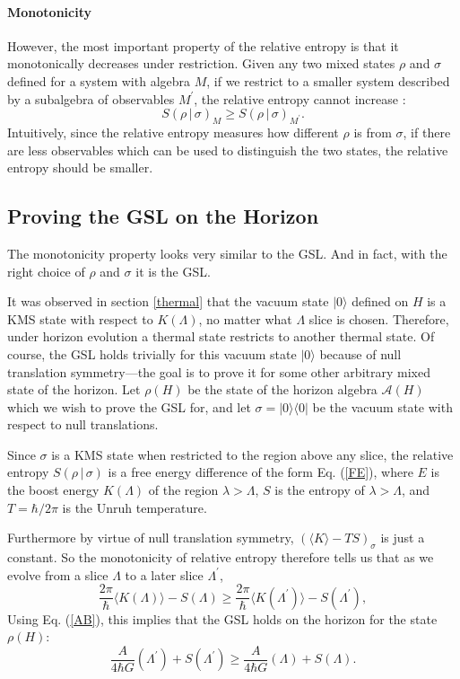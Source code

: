 \documentclass{article}
\begin{document}
\paragraph{Monotonicity} However, the most important property of the relative entropy is that it monotonically decreases under restriction.  Given any two mixed states $\rho$ and $\sigma$ defined for a system with algebra $M$, if we restrict to a smaller system described by a subalgebra of observables $M^\prime$, the relative entropy cannot increase \cite{lindblad75}:
\begin{equation}
S(\rho\,|\,\sigma)_M \ge S(\rho\,|\,\sigma)_{M^\prime}.
\end{equation}
Intuitively, since the relative entropy measures how different $\rho$ is from $\sigma$, if there are less observables which can be used to distinguish the two states, the relative entropy should be smaller.

\subsection{Proving the GSL on the Horizon}\label{proofon}

The monotonicity property looks very similar to the GSL.  And in fact, with the right choice of $\rho$ and $\sigma$ it is the GSL.

It was observed in section \ref{thermal} that the vacuum state $|0\rangle$ defined on $H$ is a KMS state with respect to $K(\Lambda)$, no matter what $\Lambda$ slice is chosen.  Therefore, under horizon evolution a thermal state restricts to another thermal state.  Of course, the GSL holds trivially for this vacuum state $|0\rangle$ because of null translation symmetry---the goal is to prove it for some other arbitrary mixed state of the horizon.  Let $\rho(H)$ be the state of the horizon algebra $\mathcal{A}(H)$ which we wish to prove the GSL for, and let $\sigma = | 0 \rangle \langle 0 |$ be the vacuum state with respect to null translations.

Since $\sigma$ is a KMS state when restricted to the region above any slice, the relative entropy $S(\rho\,|\,\sigma)$ is a free energy difference of the form Eq. (\ref{FE}), where $E$ is the boost energy $K(\Lambda)$ of the region $\lambda > \Lambda$, $S$ is the entropy of $\lambda > \Lambda$, and $T = \hbar/{2\pi}$ is the Unruh temperature.

Furthermore by virtue of null translation symmetry, $(\langle K \rangle - TS)_\sigma$ is just a constant.  So the monotonicity of relative entropy therefore tells us that as we evolve from a slice $\Lambda$ to a later slice $\Lambda^\prime$,
\begin{equation}
\frac{2\pi}{\hbar} \langle K(\Lambda) \rangle - S(\Lambda) \ge
\frac{2\pi}{\hbar} \langle K(\Lambda^\prime) \rangle - S(\Lambda^\prime),
\end{equation}
Using Eq. (\ref{AB}), this implies that the GSL holds on the horizon for the state $\rho(H)$:
\begin{equation}
\frac{A}{4\hbar G}(\Lambda^\prime) + S(\Lambda^\prime) \ge \frac{A}{4\hbar G}(\Lambda) + S(\Lambda).
\end{equation}
\end{document}
